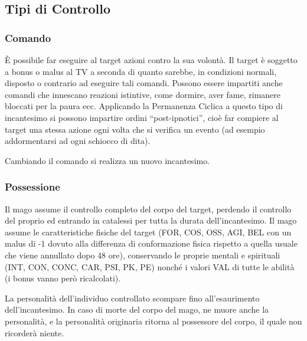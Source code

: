 \subsection{Tipi di Controllo} 

\subsubsection{Comando} 
\`E possibile
far eseguire al target azioni contro la sua volont\`a. Il target
\`e soggetto a bonus o malus al TV a seconda di quanto sarebbe, in
condizioni normali, disposto o contrario ad eseguire tali comandi.
Possono essere impartiti anche comandi che innescano reazioni
istintive, come dormire, aver fame, rimanere bloccati per la paura
ecc. Applicando la Permanenza Ciclica a questo tipo di incantesimo si
possono impartire ordini ``post-ipnotici'', cio\`e far compiere al
target una stessa azione ogni volta che si verifica un evento (ad
esempio addormentarsi ad ogni schiocco di dita). 

Cambiando il comando
si realizza un nuovo incantesimo. 




\subsubsection{Possessione}  

Il mago assume il controllo
completo del corpo del target, perdendo il controllo del proprio ed
entrando in catalessi per tutta la durata dell'incantesimo. Il mago
assume le caratteristiche fisiche del target (FOR, COS, OSS, AGI, BEL
con un malus di -1 dovuto alla differenza di conformazione fisica
rispetto a quella usuale che viene annullato dopo 48 ore), conservando
le proprie mentali e spirituali (INT, CON, CONC, CAR, PSI, PK, PE)
nonch\'e i valori VAL di tutte le abilit\`a (i bonus vanno per\`o
ricalcolati). 

La personalit\`a dell'individuo controllato scompare
fino all'esaurimento dell'incantesimo. In caso di morte del corpo del
mago, ne muore anche la personalit\`a, e la personalit\`a
originaria ritorna al possessore del corpo, il quale non ricorder\`a
niente. 

